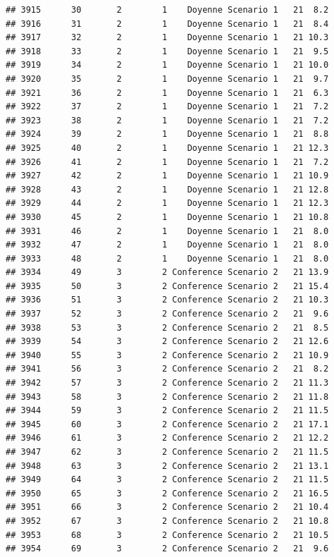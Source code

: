 \documentclass[
]{article}
\begin{document}
\begin{verbatim}
## 3915      30       2        1    Doyenne Scenario 1   21  8.2
## 3916      31       2        1    Doyenne Scenario 1   21  8.4
## 3917      32       2        1    Doyenne Scenario 1   21 10.3
## 3918      33       2        1    Doyenne Scenario 1   21  9.5
## 3919      34       2        1    Doyenne Scenario 1   21 10.0
## 3920      35       2        1    Doyenne Scenario 1   21  9.7
## 3921      36       2        1    Doyenne Scenario 1   21  6.3
## 3922      37       2        1    Doyenne Scenario 1   21  7.2
## 3923      38       2        1    Doyenne Scenario 1   21  7.2
## 3924      39       2        1    Doyenne Scenario 1   21  8.8
## 3925      40       2        1    Doyenne Scenario 1   21 12.3
## 3926      41       2        1    Doyenne Scenario 1   21  7.2
## 3927      42       2        1    Doyenne Scenario 1   21 10.9
## 3928      43       2        1    Doyenne Scenario 1   21 12.8
## 3929      44       2        1    Doyenne Scenario 1   21 12.3
## 3930      45       2        1    Doyenne Scenario 1   21 10.8
## 3931      46       2        1    Doyenne Scenario 1   21  8.0
## 3932      47       2        1    Doyenne Scenario 1   21  8.0
## 3933      48       2        1    Doyenne Scenario 1   21  8.0
## 3934      49       3        2 Conference Scenario 2   21 13.9
## 3935      50       3        2 Conference Scenario 2   21 15.4
## 3936      51       3        2 Conference Scenario 2   21 10.3
## 3937      52       3        2 Conference Scenario 2   21  9.6
## 3938      53       3        2 Conference Scenario 2   21  8.5
## 3939      54       3        2 Conference Scenario 2   21 12.6
## 3940      55       3        2 Conference Scenario 2   21 10.9
## 3941      56       3        2 Conference Scenario 2   21  8.2
## 3942      57       3        2 Conference Scenario 2   21 11.3
## 3943      58       3        2 Conference Scenario 2   21 11.8
## 3944      59       3        2 Conference Scenario 2   21 11.5
## 3945      60       3        2 Conference Scenario 2   21 17.1
## 3946      61       3        2 Conference Scenario 2   21 12.2
## 3947      62       3        2 Conference Scenario 2   21 11.5
## 3948      63       3        2 Conference Scenario 2   21 13.1
## 3949      64       3        2 Conference Scenario 2   21 11.5
## 3950      65       3        2 Conference Scenario 2   21 16.5
## 3951      66       3        2 Conference Scenario 2   21 10.4
## 3952      67       3        2 Conference Scenario 2   21 10.8
## 3953      68       3        2 Conference Scenario 2   21 10.5
## 3954      69       3        2 Conference Scenario 2   21  9.6

\end{verbatim}
\end{document}
